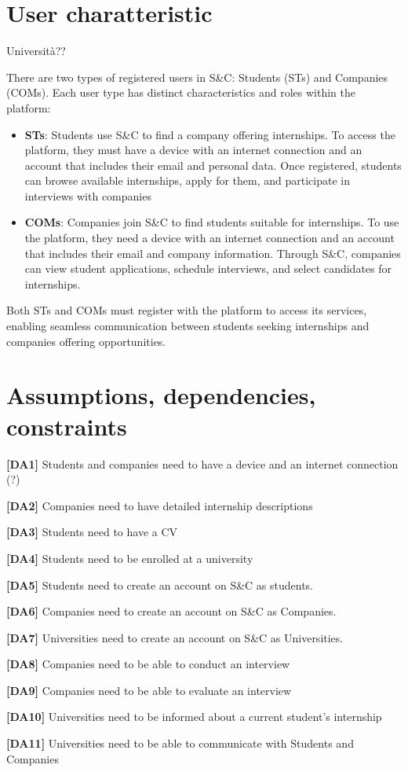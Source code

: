 \section{User charatteristic}

Università??

There are two types of registered users in S\&C: Students (STs) and Companies (COMs). Each user type has distinct characteristics and roles within the platform:

\begin{itemize}
    \item \textbf{STs}: Students use S\&C to find a company offering internships. To access the platform, they must have a device with an internet connection and an account that includes their email and personal data. Once registered, students can browse available internships, apply for them, and participate in interviews with 
    companies

    \item \textbf{COMs}:  Companies join S\&C to find students suitable for internships. To use the platform, they need a device with an internet connection and an account that includes their email and company information. Through S\&C, companies can view student applications, schedule interviews, and select candidates for internships.
\end{itemize}

Both STs and COMs must register with the platform to access its services, enabling seamless communication between students seeking internships and companies offering opportunities.

\section{Assumptions, dependencies, constraints}
\textbf{[DA1] }Students and companies need to have a device and an internet connection (?)

\textbf{[DA2]} Companies need to have detailed internship descriptions

\textbf{[DA3]} Students need to have a CV

\textbf{[DA4]} Students need to be enrolled at a university 

\textbf{[DA5]} Students need to create an account on S\&C as students.

\textbf{[DA6]} Companies need to create an account on S\&C as Companies.

\textbf{[DA7]} Universities need to create an account on S\&C as Universities.

\textbf{[DA8]} Companies need to be able to conduct an interview

\textbf{[DA9]} Companies need to be able to evaluate an interview

\textbf{[DA10]} Universities need to be informed about a current student's internship

\textbf{[DA11]} Universities need to be able to communicate with Students and Companies
